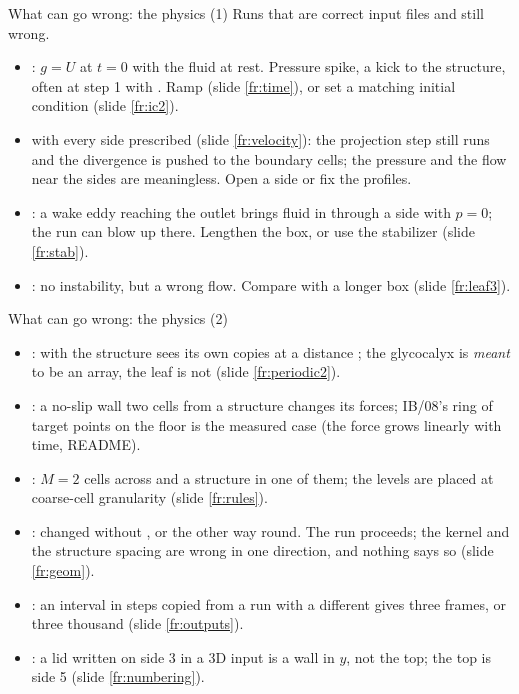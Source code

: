 \documentclass[aspectratio=169,11pt]{beamer}
\begin{document}
\begin{frame}{What can go wrong: the physics (1)}
\label{fr:phys}
\small Runs that are correct input files and still wrong.
\begin{itemize}
  \item {}: $g = U$ at $t = 0$ with the fluid at rest. Pressure spike, a kick to the structure, often  at step 1 with . Ramp (slide \ref{fr:time}), or set a matching initial condition (slide \ref{fr:ic2}).
  \item {} with every side prescribed (slide \ref{fr:velocity}): the projection step still runs and the divergence is pushed to the boundary cells; the pressure and the flow near the sides are meaningless. Open a side or fix the profiles.
  \item {}: a wake eddy reaching the outlet brings fluid in through a side with $p = 0$; the run can blow up there. Lengthen the box, or use the stabilizer (slide \ref{fr:stab}).
  \item {}: no instability, but a wrong flow. Compare with a longer box (slide \ref{fr:leaf3}).
\end{itemize}
\end{frame}

\begin{frame}{What can go wrong: the physics (2)}
\label{fr:phys2}
\small
\begin{itemize}
  \item {}: with  the structure sees its own copies at a distance ; the glycocalyx is \emph{meant} to be an array, the leaf is not (slide \ref{fr:periodic2}).
  \item {}: a no-slip wall two cells from a structure changes its forces; IB/08's ring of target points on the floor is the measured case (the force grows linearly with time, README).
  \item {}: $M = 2$ cells across and a structure in one of them; the levels are placed at coarse-cell granularity (slide \ref{fr:rules}).
  \item {}:  changed without , or the other way round. The run proceeds; the kernel and the structure spacing are wrong in one direction, and nothing says so (slide \ref{fr:geom}).
  \item {}: an interval in steps copied from a run with a different  gives three frames, or three thousand (slide \ref{fr:outputs}).
  \item {}: a lid written on side 3 in a 3D input is a wall in $y$, not the top; the top is side 5 (slide \ref{fr:numbering}).
\end{itemize}
\end{frame}
\end{document}
